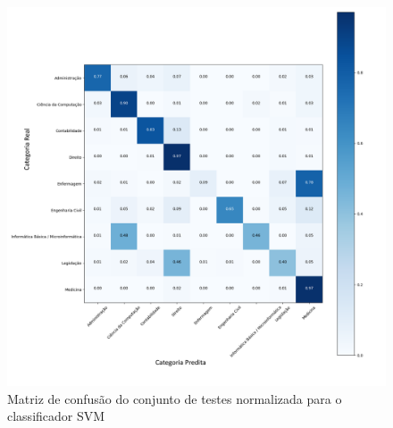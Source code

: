 \begin{figure}[!ht]
	\centering
	\includegraphics[width=1.1\textwidth]{figures/SVM_Confusion_matrix_normalized.png}
	\caption{Matriz de confusão do conjunto de testes normalizada para o classificador SVM}
	\label{fig:confusion_matrix_SVM}
\end{figure}